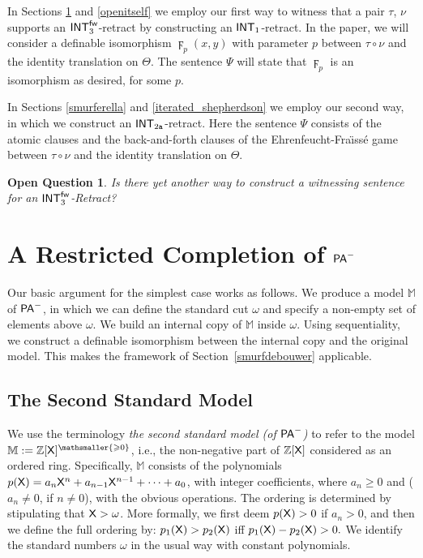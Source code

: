\documentclass{amsart}
\newcommand{\qee} {\hspace*{2mm}\hfill \ding{109}}
\renewcommand{\geq}{\geqslant}
\renewcommand{\Theta}{\varTheta}
\renewcommand{\Psi}{\varPsi}
\newtheorem{ques}[theorem]{Open Question}
\newenvironment{question}{\begin{ques} \rm}{\qee\end{ques}}
\newcommand{\pam}{\ensuremath{{\sf PA}^{-}}}
\newcommand{\X}{{\sf X}}
\begin{document}
In Sections \ref{pamitself} and \ref{openitself} we employ our first way to witness that a pair $\tau$, $\nu$ supports an 
${\sf INT}_3^{\sf fw}$-retract by constructing an ${\sf INT}_1$-retract.
In the paper, we will consider a definable isomorphism $\digamma_p(x,y)$ with parameter $p$
between $\tau \circ \nu$ and the identity translation on $\Theta$. The sentence $\Psi$ will
state that $\digamma_p$ is an isomorphism as desired, for some $p$.

In Sections \ref{smurferella} and \ref{iterated_shepherdson} we employ our second way, in which we construct an ${\sf INT}_{2{\tt a}}$-retract.
Here the sentence $\Psi$ consists of the atomic clauses and the
back-and-forth clauses of the Ehrenfeucht-Fra\"{\i}ss\'{e}  game between $\tau \circ \nu$ and the identity translation on $\Theta$.

\begin{question}\label{Q_about_retracts}
    Is there yet another way to construct a witnessing sentence for an ${\sf INT}_3^{\sf fw}$-Retract?
\end{question}

\section{A Restricted Completion of $\pam$}\label{pamitself}
Our basic argument for the simplest case works as follows. We produce a model $\mathbb M$ of \pam, in which
we can define the standard cut $\omega$ and specify a non-empty set of elements above $\omega$. 
We build an internal copy of $\mathbb M$ inside $\omega$. Using sequentiality, we construct
a definable isomorphism between the internal copy and the original model. This makes the framework of
Section~\ref{smurfdebouwer} applicable.

\subsection{The Second Standard Model}\label{secondstandard}
We use the terminology \emph{the second standard model \textup(of $\pam$\textup)} 
to refer to the model $\mathbb M:= \mathbb Z[\X]^{\mathsmaller{\geq 0}}$, i.e., 
the non-negative part of $\mathbb Z[\X]$ considered as an ordered ring. 
Specifically, $\mathbb M$ consists of 
the polynomials  $p(\X)=a_n \X^n+ a_{n-1} \X^{n-1} + \cdots + a_0$, with integer 
coefficients, where $a_n\geq 0$ and ($a_n\neq 0$, if $n \neq  0$), with the obvious operations. 
The ordering is determined by stipulating that $\X > \omega$. More formally, we first deem $p(\X)>0$ if $a_n>0$, and then we define the full ordering  by:  $p_1(\X)>p_2(\X)$ iff $p_1(\X)-p_2(\X)>0.$
We identify the standard numbers $\omega$ in the usual way
with constant polynomials. 
\end{document}
